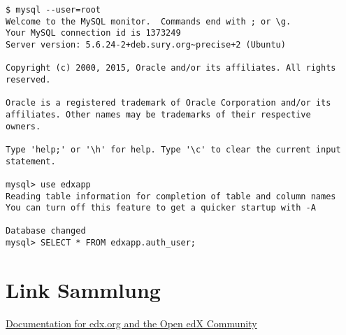 \documentclass{scrartcl}
\begin{document}
\begin{lstlisting}[caption={Auflisten aller Benutzer(MySQL)}, label=lst:mysql_list_users, breaklines]
$ mysql --user=root
Welcome to the MySQL monitor.  Commands end with ; or \g.
Your MySQL connection id is 1373249
Server version: 5.6.24-2+deb.sury.org~precise+2 (Ubuntu)

Copyright (c) 2000, 2015, Oracle and/or its affiliates. All rights reserved.

Oracle is a registered trademark of Oracle Corporation and/or its
affiliates. Other names may be trademarks of their respective
owners.

Type 'help;' or '\h' for help. Type '\c' to clear the current input statement.

mysql> use edxapp
Reading table information for completion of table and column names
You can turn off this feature to get a quicker startup with -A

Database changed
mysql> SELECT * FROM edxapp.auth_user;

\end{lstlisting}

\section{Link Sammlung}

\href{http://docs.edx.org/}{Documentation for edx.org and the Open edX Community}
\end{document}
